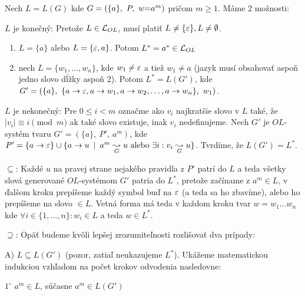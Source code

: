\begin{dokaz}
    Nech $L=L(G)$ kde $G=(\{a\},\ P,\ w\mbox{=} a^{m})$ pričom $m\geq1$. Máme 2 možnosti:

    \begin{enumerate}
    \item $L$ je konečný: Pretože $L \in \mathcal{L}_{OL}$, musí platiť
        $L \ne \{\varepsilon\}, L \ne \emptyset$.
        \begin{enumerate}
        \item $L=\{a\}$ alebo $L=\{\varepsilon,a\}$. Potom
            $L^{*}=a^{*} \in \mathcal{L}_{OL}$

        \item nech $L=\{w_{1},\dots,w_{n}\}$, kde
            $w_{1}\neq\varepsilon$ a tiež $w_{1}\neq a$ (jazyk musí obsahovať aspoň
            jedno slovo dĺžky aspoň 2).
            Potom $L^{*}=L(G')$, kde $G'=(\{a\},\ 
            \{a \pravidlo \eps, a\pravidlo w_1, a \pravidlo w_2, \dots,
            a \pravidlo w_{n}\},\ w_{1})$.
        \end{enumerate}

    \item $L$ je nekonečný:
        Pre $0 \le i < m$ označme ako $v_i$
        najkratšie slovo v $L$ také, že $|v_{i}|\equiv i \pmod{m}$ ak 
        také slovo existuje, inak $v_i$ nedefinujeme.
        Nech $G'$ je $OL$-systém tvaru $G'=(\{a\},\ P',\ a^{m})$, kde
        $P'=\{a\rightarrow\varepsilon\}\cup
            \{a\rightarrow u \enspace |\enspace a^{m} \underset{G}{\leadsto} u
            \mbox{ alebo }
            \exists i: v_{i} \underset{G}{\leadsto} u\}$.
        Tvrdíme, že $L(G')=L^{*}$.

        \begin{description}
        \item{$\subseteq$:} Každé $u$ na pravej strane nejakého
            pravidla z $P'$ patrí do
            $L$ a teda všetky slová generované $OL$-systémom $G'$ patria do
            $L^{*}$, pretože začíname z $a^{m}\in L$, v ďalšom kroku prepíšeme
            každý symbol buď na $\varepsilon$ (a teda sa ho zbavíme), alebo ho
            prepíšeme na slovo $\in L$. Vetná forma má teda v každom kroku
            tvar $w=w_1 \dots w_n$ kde
            $\forall i\in\{1,\dots,n\}:w_i\in L$ a teda $w\in L^{*}$.

        \item{$\supseteq$:} Opäť budeme kvôli lepšej zrozumiteľnosti
            rozlišovať dva prípady:
            \begin{description}
            \item{A)} $L\subseteq L(G')$ (pozor, zatiaľ neukazujeme $L^*$).
                Ukážeme matematickou indukciou vzhľadom na počet krokov
                odvodenia nasledovne:
                \begin{description}
                \item{$1^{\circ}$} $a^{m}\in L$, súčasne $a^{m}\in L(G')$


\end{description}
\end{description}
\end{description}
\end{enumerate}
\end{dokaz}
